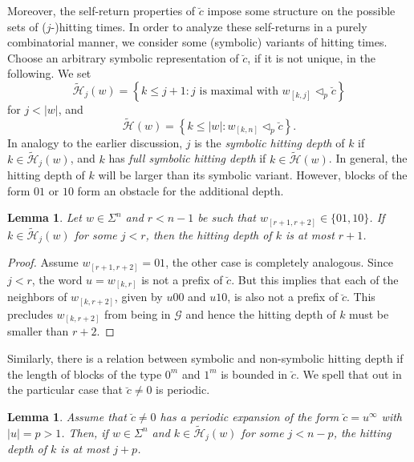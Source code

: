 \documentclass[11pt,reqno]{amsart}
\theoremstyle{plain}
\newtheorem{lemma}[theorem]{Lemma}
\theoremstyle{definition}
\newcommand{\mc}{\mathcal}
\begin{document}
Moreover, the self-return properties of $\breve{c}$ impose some structure on the possible sets of \mbox{($j$-)}hit\-ting times. In order to analyze these self-returns in a purely combinatorial manner, we consider some (symbolic) variants of hitting times. Choose an arbitrary symbolic representation of $\breve{c}$, if it is not unique, in the following. We set
\[
\widetilde{\mc H}_j(w) = \left\{ k \leqslant j+1 : j \mbox{ is maximal with } w_{[k,j]} \triangleleft_p \breve{c}  \right\}
\]
 for $j<|w|$, 
 and
\[
\widetilde{\mc H} (w) = \left\{k \leqslant |w|: w_{[k,n]} \triangleleft_p \breve{c} \right\}.
\]
In analogy to the earlier discussion, $j$ is the \emph{symbolic hitting depth} of $k$ if $k \in \widetilde{\mc H}_j(w)$, and $k$ has \emph{full symbolic hitting depth} if $k \in \widetilde{\mc H} (w)$. In general, the hitting depth of $k$ will be larger than its symbolic variant. However, blocks of the form $01$ or $10$ form an obstacle for the additional depth.
\begin{lemma}
\label{LEM:hitting-depths-relations}
Let $w \in \Sigma^n$ and $r<n-1$ be such that $w_{[r+1,r+2]} \in \{01,10 \}$. If $k \in \widetilde{\mc H}_j(w)$ for some $j < r $, then the hitting depth of $k$ is at most $r+1$.
\end{lemma}

\begin{proof}
Assume $w_{[r+1,r+2]} = 01$, the other case is completely analogous. Since $j < r$, the word $u=w_{[k,r]}$ is not a prefix of $\breve{c}$. But this implies that each of the neighbors of $w_{[k,r+2]}$, given by $u00$ and $u10$, is also not a prefix of $\breve{c}$. This precludes $w_{[k,r+2]}$ from being in $\mc G$ and hence the hitting depth of $k$ must be smaller than $r+2$.
\end{proof}

Similarly, there is a relation between symbolic and non-symbolic hitting depth if the length of blocks of the type $0^m$ and $1^m$ is bounded in $\breve{c}$. We spell that out in the particular case that $\breve{c} \neq 0$ is periodic.

\begin{lemma}
\label{LEM:periodic-hitting-depth}
Assume that $\breve{c} \neq 0$ has a periodic expansion of the form $\breve{c} = u^\infty$ with $|u| = p > 1$. Then, if $w \in \Sigma^n$ and $k \in \widetilde{\mc H}_j(w)$ for some $j < n-p$, the hitting depth of $k$ is at most $j+p$.
\end{lemma}
\end{document}
